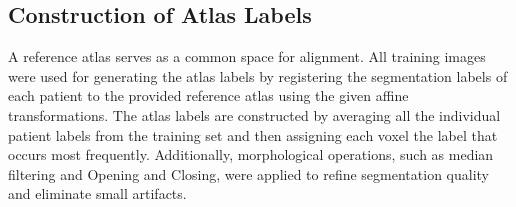 \subsection{Construction of Atlas Labels}
A reference atlas serves as a common space for alignment. All training images were used for generating the atlas labels by registering the segmentation labels of each patient to the provided reference atlas using the given affine transformations. The atlas labels are constructed by averaging all the individual patient labels from the training set and then assigning each voxel the label that occurs most frequently. Additionally, morphological operations, such as median filtering and Opening and Closing, were applied to refine segmentation quality and eliminate small artifacts.




